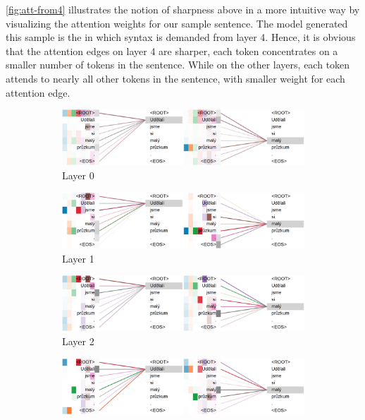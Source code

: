 \cref{fig:att-from4} illustrates the notion of sharpness above in a more intuitive way by visualizing the attention weights for our sample sentence.
The model generated this sample is the \DepParse in which syntax is demanded from layer 4.
Hence, it is obvious that the attention edges on layer 4 are sharper, each token concentrates on a smaller number of tokens in the sentence.
While on the other layers, each token attends to nearly all other tokens in the sentence, with smaller weight for each attention edge.

\begin{figure}[t]
    \centering
    \begin{subfigure}[b]{0.9\textwidth}
        \centering
	    \includegraphics[width=\textwidth]{img/att-from4-l0.png}
        \caption{Layer 0}
    \end{subfigure}
    \begin{subfigure}[b]{0.9\textwidth}
        \centering
	    \includegraphics[width=\textwidth]{img/att-from4-l1.png}
        \caption{Layer 1}
    \end{subfigure}
    \begin{subfigure}[b]{0.9\textwidth}
        \centering
	    \includegraphics[width=\textwidth]{img/att-from4-l2.png}
        \caption{Layer 2}
    \end{subfigure}
    \begin{subfigure}[b]{0.9\textwidth}
        \centering
	    \includegraphics[width=\textwidth]{img/att-from4-l3.png}

\end{subfigure}
\end{figure}
